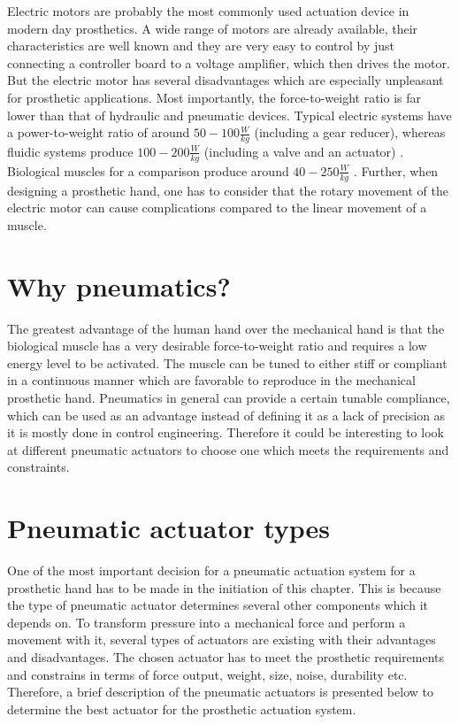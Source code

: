 \documentclass[main]{subfiles}
\begin{document}
Electric motors are probably the most commonly used actuation device in modern day prosthetics. A wide range of motors are already available, their characteristics are well known and they are very easy to control by just connecting a controller board to a voltage amplifier, which then drives the motor. But the electric motor has several disadvantages which are especially unpleasant for prosthetic applications. Most importantly, the force-to-weight ratio is far lower than that of hydraulic and pneumatic devices. Typical electric systems have a power-to-weight ratio of around $50-100 \frac{W}{kg}$ (including a gear reducer), whereas fluidic systems produce $100-200 \frac{W}{kg}$ (including a valve and an actuator) \cite{Binnard1995}. Biological muscles for a comparison produce around $40-250  \frac{W}{kg}$ \cite{Davis2001}. Further, when designing a prosthetic hand, one has to consider that the rotary movement of the electric motor can cause complications compared to the linear movement of a muscle.

\section{Why pneumatics?}

The greatest advantage of the human hand over the mechanical hand is that the biological muscle has a very desirable force-to-weight ratio and requires a low energy level to be activated. The muscle can be tuned to either stiff or compliant in a continuous manner which are favorable to reproduce in the mechanical prosthetic hand. Pneumatics in general can provide a certain tunable compliance, which can be used as an advantage instead of defining it as a lack of precision as it is mostly done in control engineering. Therefore it could be interesting to look at different pneumatic actuators to choose one which meets the requirements and constraints.

\section{Pneumatic actuator types}

One of the most important decision for a pneumatic actuation system for a prosthetic hand has to be made in the initiation of this chapter. This is because the type of pneumatic actuator determines several other components which it depends on. To transform pressure into a mechanical force and perform a movement with it, several types of actuators are existing with their advantages and disadvantages. The chosen actuator has to meet the prosthetic requirements and constrains in terms of force output, weight, size, noise, durability etc. Therefore, a brief description of the pneumatic actuators is presented below to determine the best actuator for the prosthetic actuation system.
\end{document}
